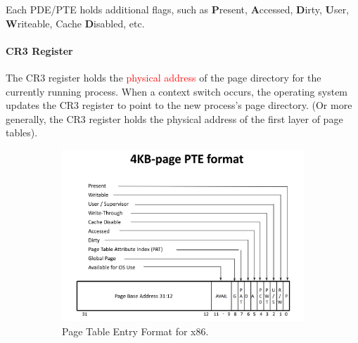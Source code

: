 \documentclass[openany,12pt]{book}
\newcommand{\red}[1]{\textcolor{Red}{#1}}
\begin{document}
\vspace*{0.5em} 

Each PDE/PTE holds additional flags, such as \textbf{P}resent, \textbf{A}ccessed, \textbf{D}irty, \textbf{U}ser, \textbf{W}riteable, Cache \textbf{D}isabled, etc. 

\paragraph{CR3 Register} The CR3 register holds the \red{physical address} of the page directory for the currently running process. When a context switch occurs, the operating system updates the CR3 register to point to the new process's page directory. (Or more generally, the CR3 register holds the physical address of the first layer of page tables).


\begin{figure}[H]
    \centering
    \begin{subfigure}[b]{0.6\textwidth}
        \centering
        \includegraphics[width=\textwidth]{PTE-format.png}
        \caption{Page Table Entry Format for x86.}
        \label{fig:PTE-format}
    \end{subfigure}
    \hfill %
    \begin{subfigure}[b]{0.3\textwidth}
        \centering

\end{subfigure}
\end{figure}
\end{document}
